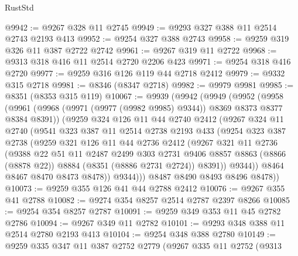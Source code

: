 \begin{lexlean}{RustStd}
\begin{coremodule}
{\begin{coremodule}
{{{{{{{{{{{{{{{{{{{{{{{{{{{{{{{{{{{{{{{{{{{{{{{{{{@9942 := @9267 @328 @11 @2745
@9949 := @9293 @327 @388 @11 @2514 @2743 @2193 @413
@9952 := @9254 @327 @388 @2743
@9958 := @9259 @319 @326 @11 @387 @2722 @2742
@9961 := @9267 @319 @11 @2722
@9968 := @9313 @318 @416 @11 @2514 @2720 @2206 @423
@9971 := @9254 @318 @416 @2720
@9977 := @9259 @316 @126 @119 @44 @2718 @2412
@9979 := @9332 @315 @2718
@9981 := @8346 (@8347 @2718)
@9982 := @9979 @9981
@9985 := @8351 (@8353 @315 @119)
@10067 := @9939
    (@9942
      (@9949
        (@9952
          (@9958
            (@9961 (@9968 (@9971 (@9977 (@9982 @9985) @9344)) @8369 @8373 @8377 @8384 @8391))
            (@9259
              @324
              @126
              @11
              @44
              @2740
              @2412
              (@9267
                @324
                @11
                @2740
                (@9541
                  @323
                  @387
                  @11
                  @2514
                  @2738
                  @2193
                  @433
                  (@9254
                    @323
                    @387
                    @2738
                    (@9259
                      @321
                      @126
                      @11
                      @44
                      @2736
                      @2412
                      (@9267
                        @321
                        @11
                        @2736
                        (@9388
                          @22
                          @51
                          @11
                          @2487
                          @2499
                          @303
                          @2731
                          @9406
                          @8857
                          @8863
                          (@8866 (@8878 @22))
                          @8884
                          (@8351 (@8886 @2731 @2724))
                          @8391))
                      @9344))
                  @8464
                  @8467
                  @8470
                  @8473
                  @8478))
              @9344)))
        @8487
        @8490
        @8493
        @8496
        @8478))
@10073 := @9259 @355 @126 @41 @44 @2788 @2412
@10076 := @9267 @355 @41 @2788
@10082 := @9274 @354 @8257 @2514 @2787 @2397 @8266
@10085 := @9254 @354 @8257 @2787
@10091 := @9259 @349 @353 @11 @45 @2782 @2786
@10094 := @9267 @349 @11 @2782
@10101 := @9293 @348 @388 @11 @2514 @2780 @2193 @413
@10104 := @9254 @348 @388 @2780
@10149 := @9259
    @335
    @347
    @11
    @387
    @2752
    @2779
    (@9267
      @335
      @11
      @2752
      (@9313
}}}}}}}}}}}}}}}}}}}}}}}}}}}}}}}}}}}}}}}}}}}}}}}}}}
\end{coremodule}}
\end{coremodule}
\end{lexlean}
